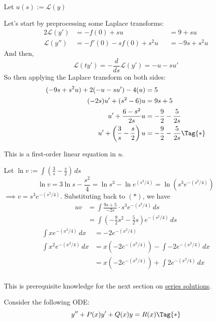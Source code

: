 \begin{compute}
  \def\L{\mathcal L}

  Let $u(s):=\L(y)$

  Let's start by preprocessing some Laplace transforms:
  \begin{alignat*}{2}
    \L(y')  & =-f(0)+su          &  & = 9+su     \\
    \L(y'') & =-f'(0)-sf(0)+s^2u &  & = -9s+s^2u
  \end{alignat*}
  And then,
  $$
    \L(ty')=-\frac{d}{ds}\L(y')=-u-su'
  $$
  So then applying the Laplace transform on both sides:
  \begin{align*}
    (-9s+s^2u)+2(-u-su')-4(u)         &=5                          \\
    (-2s)u'+(s^2-6)u                  &=9s+5                       \\
    u'+\frac{6-s^2}{2s}u              &=-\frac92-\frac5{2s}        \\
    u'+\left(\frac3s-\frac s2\right)u &=-\frac92-\frac5{2s}\Tag{*}
  \end{align*}

  This is a first-order linear equation in $u$.

  Let $\displaystyle\ln v:=\int\left(\frac3s-\frac s2\right)\,ds$
  $$
    \ln v = 3\ln s-\frac{s^2}4
    = \ln s^3-\ln e^{(s^2/4)}
    = \ln (s^3e^{-(s^2/4)})
  $$
  $\implies v=s^3e^{-(s^2/4)}$. Substituting back to $(*)$, we have
  \begin{align*}
    uv &=\int\frac{9s+5}{-2s}\cdot s^3e^{-(s^2/4)}\,ds           \\
       &=\int\left(-\frac92s^2-\frac5{2}s\right)e^{-(s^2/4)}\,ds
  \end{align*}
  \begin{align*}
    \int xe^{-(x^2/4)}\,dx   &= -2e^{-(x^2/4)}                           \\
    \int x^2e^{-(x^2/4)}\,dx &= x(-2e^{-(x^2/4)})-\int-2e^{-(x^2/4)}\,dx \\
                             &= x(-2e^{-(x^2/4)})+\int2e^{-(x^2/4)}\,dx  \\
  \end{align*}

\end{compute}

\label{f490530}

This is prerequisite knowledge for the next section on \href{fdab69a}{series
solutions}.

Consider the following ODE:
\begin{equation*}
  y''+P(x)y'+Q(x)y=R(x)\Tag{*}
\end{equation*}

